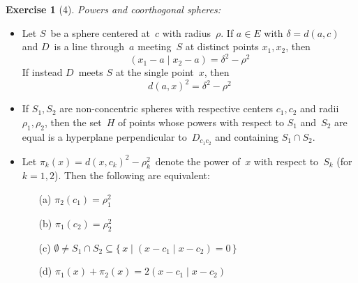 \documentclass[letterpaper,12pt]{article}
\newcommand{\sect}{\cap}
\newcommand{\innerprod}[2]{({#1}\;|\;{#2})}
\theoremstyle{definition}
\newtheorem*{exer}{Exercise}
\theoremstyle{remark}
\begin{document}
\begin{exer}[4]
\emph{Powers and coorthogonal spheres:}
\begin{itemize}[itemsep=0pt]
\item Let \(S\)~be a sphere centered at~\(c\) with radius~\(\rho\). If \(a\in E\) with \(\delta=d(a,c)\) and \(D\)~is a line through~\(a\) meeting~\(S\) at distinct points \(x_1,x_2\), then
\[\innerprod{x_1-a}{x_2-a}=\delta^2-\rho^2\]
If instead \(D\)~meets \(S\) at the single point~\(x\), then
\[d(a,x)^2=\delta^2-\rho^2\]
\item If \(S_1,S_2\) are non-concentric spheres with respective centers \(c_1,c_2\) and radii \(\rho_1,\rho_2\), then the set~\(H\) of points whose powers with respect to \(S_1\) and~\(S_2\) are equal is a hyperplane perpendicular to~\(D_{c_1c_2}\) and containing \(S_1\sect S_2\).
\item Let \(\pi_k(x)=d(x,c_k)^2-\rho_k^2\)~denote the power of~\(x\) with respect to~\(S_k\) (for \(k=1,2\)). Then the following are equivalent:
\begin{itemize}[itemsep=0pt]
\item[(a)] \(\pi_2(c_1)=\rho_1^2\)
\item[(b)] \(\pi_1(c_2)=\rho_2^2\)
\item[(c)] \(\emptyset\ne S_1\sect S_2\subseteq\{\,x\mid\innerprod{x-c_1}{x-c_2}=0\,\}\)
\item[(d)] \(\pi_1(x)+\pi_2(x)=2\innerprod{x-c_1}{x-c_2}\)
\end{itemize}
\end{itemize}
\end{exer}
\end{document}

